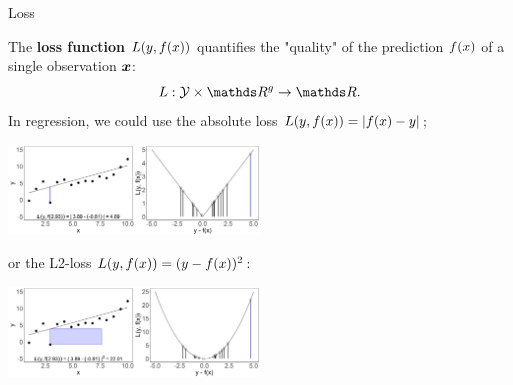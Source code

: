 \documentclass[11pt,compress,t,notes=noshow, xcolor=table]{beamer}
\begin{document}
\begin{vbframe}{Loss}

The \textbf{loss function} $L(y, f(x))$ quantifies the "quality" of the prediction $f(x)$ of a single observation $\bm{x}$:
    $$
    L: \Yspace \times \R^g \to \R.
    $$
In regression, we could use the absolute loss $L(y, f(x)) = |f(x) - y|$; 





\begin{center}
\includegraphics[width=0.5\textwidth]{figure/ml-basic_riskmin-1-loss_abs.png}
\end{center}
or the L2-loss $L(y, f(x)) = (y - f(x))^2$:
\begin{center}
\includegraphics[width=0.5\textwidth]{figure/ml-basic_riskmin-1-loss_sqrd.png}
\end{center}





\end{vbframe}
\end{document}
